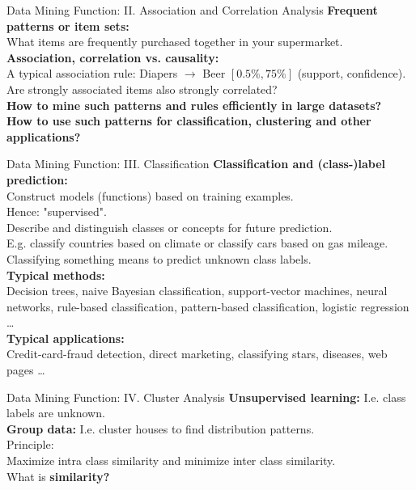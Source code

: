 \begin{frame}{Data Mining Function: II. Association and Correlation Analysis}
	\textbf{Frequent patterns or item sets:}\\
	What items are frequently purchased together in your supermarket.\\[0.5cm]
	
	\textbf{Association, correlation vs. causality:}\\
	A typical association rule: Diapers $\rightarrow$ Beer $[0.5\%,75\%]$ 
	(support, confidence).\\
	Are strongly associated items also strongly correlated?\\[0.5cm]
	
	\textbf{How to mine such patterns and rules efficiently in large 
	datasets?}\\
	\textbf{How to use such patterns for classification, clustering and other 
	applications?}
\end{frame}

\begin{frame}{Data Mining Function: III. Classification}
	\textbf{Classification and (class-)label prediction:}\\
	Construct models (functions) based on training examples. \\
	Hence: "supervised".\\
	Describe and distinguish classes or concepts for future prediction.\\
	E.g. classify countries based on climate or classify cars based on gas 
	mileage.\\
	Classifying something means to predict unknown class labels. \\[0.5cm]
	
	\textbf{Typical methods:}\\
	Decision trees, naive Bayesian classification, support-vector machines, 
	neural networks, rule-based classification, pattern-based classification, 
	logistic regression \ldots\\[0.5cm]
	
	\textbf{Typical applications:}\\
	Credit-card-fraud detection, direct marketing, classifying stars, diseases, 
	web pages \ldots
\end{frame}

\begin{frame}{Data Mining Function: IV. Cluster Analysis}
	\textbf{Unsupervised learning:} I.e. class labels are unknown.\\
	\textbf{Group data:} I.e. cluster houses to find distribution 
	patterns.\\[0.5cm]
	
	Principle:\\
	Maximize intra class similarity and minimize inter class 
	similarity.\\[0.5cm]
	
	What is \textbf{similarity?}
\end{frame}

